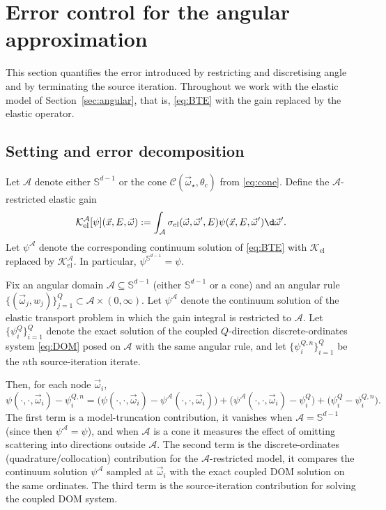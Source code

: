 \documentclass[final]{amsart}
\begin{document}
\section{Error control for the angular approximation}
\label{sec:errorcontrol}

This section quantifies the error introduced by restricting and
discretising angle and by terminating the source iteration. Throughout we
work with the elastic model of Section~\ref{sec:angular}, that is,
\eqref{eq:BTE} with the gain replaced by the elastic operator.

\subsection{Setting and error decomposition}
\label{subsec:errorcontrol-setting}

Let $\mathcal A$ denote either $\mathbb S^{d-1}$ or the cone
$\mathcal C(\vec\omega_\star,\theta_c)$ from \eqref{eq:cone}. Define the
$\mathcal A$-restricted elastic gain
\[
  \mathcal{K}_{\mathrm{el}}^{\mathcal A}[\psi](\vec{x},E,\vec{\omega})
  :=
  \int_{\mathcal A}
  \sigma_{\mathrm{el}}(\vec{\omega},\vec{\omega}',E) 
  \psi(\vec{x},E,\vec{\omega}') \d\vec{\omega}'.
\]
Let $\psi^{\mathcal A}$ denote the corresponding continuum solution of
\eqref{eq:BTE} with $\mathcal K_{\mathrm{el}}$ replaced by
$\mathcal K_{\mathrm{el}}^{\mathcal A}$. In particular,
$\psi^{\mathbb S^{d-1}}=\psi$.

Fix an angular domain $\mathcal A\subseteq \mathbb S^{d-1}$ (either
$\mathbb S^{d-1}$ or a cone) and an angular rule
$\{(\vec\omega_j,w_j)\}_{j=1}^Q\subset\mathcal A\times(0,\infty)$.
Let $\psi^{\mathcal A}$ denote the continuum solution of the elastic
transport problem in which the gain integral is restricted to
$\mathcal A$. Let $\{\psi_i^{Q}\}_{i=1}^Q$ denote the exact solution of
the coupled $Q$-direction discrete-ordinates system \eqref{eq:DOM} posed
on $\mathcal A$ with the same angular rule, and let
$\{\psi_i^{Q,n}\}_{i=1}^Q$ be the $n$th source-iteration iterate.

Then, for each node $\vec\omega_i$,
\begin{equation}
  \label{eq:error-split}
  \psi(\cdot,\cdot,\vec\omega_i)-\psi_i^{Q,n}
  =
  \big(\psi(\cdot,\cdot,\vec\omega_i)-\psi^{\mathcal A}(\cdot,\cdot,\vec\omega_i)\big)
  +
  \big(\psi^{\mathcal A}(\cdot,\cdot,\vec\omega_i)-\psi_i^{Q}\big)
  +
  \big(\psi_i^{Q}-\psi_i^{Q,n}\big).
\end{equation}
The first term is a model-truncation contribution, it vanishes when
$\mathcal A=\mathbb S^{d-1}$ (since then $\psi^{\mathcal A}=\psi$), and
when $\mathcal A$ is a cone it measures the effect of omitting
scattering into directions outside $\mathcal A$. The second term is the
discrete-ordinates (quadrature/collocation) contribution for the
$\mathcal A$-restricted model, it compares the continuum solution
$\psi^{\mathcal A}$ sampled at $\vec\omega_i$ with the exact coupled DOM
solution on the same ordinates. The third term is the source-iteration
contribution for solving the coupled DOM system.
\end{document}
